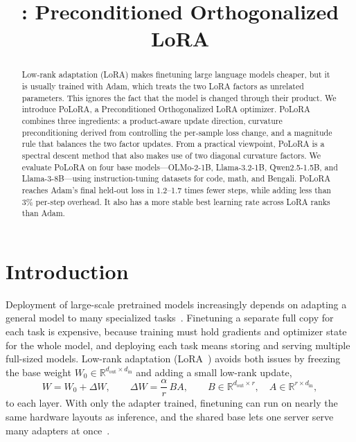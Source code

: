 \documentclass[11pt]{article}
\title{\methodname: Preconditioned Orthogonalized LoRA}
\author{}
\date{}
\newcommand{\R}{\mathbb{R}}
\newcommand{\DW}{\Delta W}
\theoremstyle{plain}
\theoremstyle{definition}
\theoremstyle{remark}
\theoremstyle{definition}
\begin{document}
\maketitle

\begin{abstract}
Low-rank adaptation (LoRA) makes finetuning large language models cheaper, but it is usually trained with Adam, which treats the two LoRA factors as unrelated parameters. This ignores the fact that the model is changed through their product. We introduce PoLoRA, 
a Preconditioned Orthogonalized LoRA 
 optimizer. PoLoRA combines three ingredients: a product-aware update direction,  curvature preconditioning derived from controlling the per-sample loss change, and a magnitude rule that balances the two factor updates.
 From a practical viewpoint, PoLoRA is a spectral descent method that also makes use of two diagonal curvature factors.
 We evaluate PoLoRA on four base models—OLMo-2-1B, Llama-3.2-1B, Qwen2.5-1.5B, and Llama-3-8B—using instruction-tuning datasets for code, math, and Bengali. PoLoRA reaches Adam's final held-out loss in 1.2--1.7 times fewer steps, while adding less than 3\% per-step overhead.
 It also has a more stable best learning rate across LoRA ranks than Adam.
\end{abstract}


\section{Introduction}
\label{sec:intro}

Deployment of large-scale pretrained models increasingly depends on adapting a
general model to many specialized tasks~\cite{foundation_models}. Finetuning a separate full copy for each task is expensive, because training must hold gradients and optimizer state for the whole model, and deploying each task means storing and serving multiple full-sized models. Low-rank adaptation (LoRA~\cite{lora}) avoids both issues by freezing the base weight $W_0 \in \R^{d_{\mathrm{out}} \times d_{\mathrm{in}}}$ and adding a small low-rank update,
\begin{equation}
W = W_0 + \DW, \qquad \DW = \frac{\alpha}{r}\,BA, \qquad
B \in \mathbb{R}^{d_{\mathrm{out}} \times r}, \quad
A \in \mathbb{R}^{r \times d_{\mathrm{in}}},
\label{eq:lora}
\end{equation}
to each layer. With only the adapter trained, finetuning can run on nearly the same hardware layouts as inference, and the shared base lets one server serve many adapters at once~\cite{punica,bitdelta,schulman2025lora}.
\end{document}
